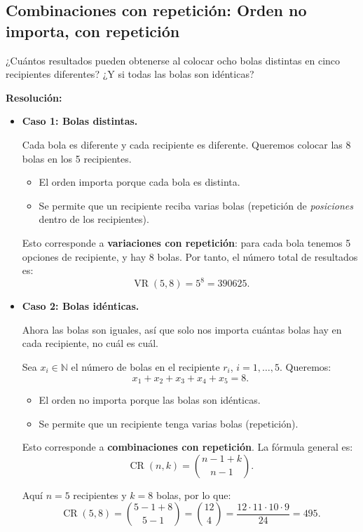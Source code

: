 \documentclass[a4paper,12pt]{article}
\begin{document}
\subsection{Combinaciones con repetición: Orden no importa, con repetición}

\begin{ejercicio}[title=Ejercicio 18]
¿Cuántos resultados pueden obtenerse al colocar ocho bolas distintas en cinco recipientes diferentes? ¿Y si todas las bolas son idénticas?

\tcblower
\textbf{Resolución:}

\begin{itemize}
\item \textbf{Caso 1: Bolas distintas.}  

Cada bola es diferente y cada recipiente es diferente. Queremos colocar las 8 bolas en los 5 recipientes.  

\begin{itemize}
\item El orden importa porque cada bola es distinta.  
\item Se permite que un recipiente reciba varias bolas (repetición de \textit{posiciones} dentro de los recipientes).  
\end{itemize}

Esto corresponde a \textbf{variaciones con repetición}: para cada bola tenemos 5 opciones de recipiente, y hay 8 bolas. Por tanto, el número total de resultados es:
\[
\operatorname{VR}(5,8) = 5^8 = \boxed{390625}.
\]

\item \textbf{Caso 2: Bolas idénticas.}  

Ahora las bolas son iguales, así que solo nos importa cuántas bolas hay en cada recipiente, no cuál es cuál.  

Sea \(x_i \in \mathbb{N}\) el número de bolas en el recipiente \(r_i\), \(i=1,\dots,5\). Queremos:
\[
x_1 + x_2 + x_3 + x_4 + x_5 = 8.
\]

\begin{itemize}
\item El orden no importa porque las bolas son idénticas.  
\item Se permite que un recipiente tenga varias bolas (repetición).  
\end{itemize}

Esto corresponde a \textbf{combinaciones con repetición}. La fórmula general es:
\[
\operatorname{CR}(n,k) = \binom{n-1+k}{n-1}.
\]

Aquí \(n=5\) recipientes y \(k=8\) bolas, por lo que:
\[
\operatorname{CR}(5,8) = \binom{5-1+8}{5-1} = \binom{12}{4} = \frac{12 \cdot 11 \cdot 10 \cdot 9}{24} = \boxed{495}.
\]
\end{itemize}

\end{ejercicio}
\end{document}
